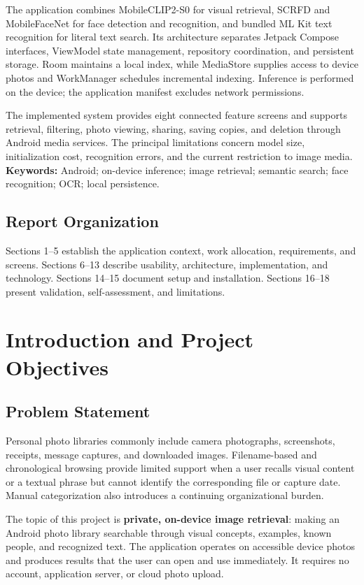\documentclass[11pt,a4paper]{article}
\newcommand{\reportsection}[1]{\section{#1}}
\begin{document}
The application combines MobileCLIP2-S0 for visual retrieval, SCRFD and MobileFaceNet for face detection and recognition, and bundled ML Kit text recognition for literal text search. Its architecture separates Jetpack Compose interfaces, ViewModel state management, repository coordination, and persistent storage. Room maintains a local index, while MediaStore supplies access to device photos and WorkManager schedules incremental indexing. Inference is performed on the device; the application manifest excludes network permissions.

The implemented system provides eight connected feature screens and supports retrieval, filtering, photo viewing, sharing, saving copies, and deletion through Android media services. The principal limitations concern model size, initialization cost, recognition errors, and the current restriction to image media. 
\textbf{Keywords:} Android; on-device inference; image retrieval; semantic search; face recognition; OCR; local persistence.


\subsection*{Report Organization}
Sections 1--5 establish the application context, work allocation, requirements, and screens. Sections 6--13 describe usability, architecture, implementation, and technology. Sections 14--15 document setup and installation. Sections 16--18 present validation, self-assessment, and limitations.

\clearpage
{}
{\small\tableofcontents}
\clearpage
{}

\reportsection{Introduction and Project Objectives}

\subsection{Problem Statement}

Personal photo libraries commonly include camera photographs, screenshots, receipts, message captures, and downloaded images. Filename-based and chronological browsing provide limited support when a user recalls visual content or a textual phrase but cannot identify the corresponding file or capture date. Manual categorization also introduces a continuing organizational burden.

The topic of this project is \textbf{private, on-device image retrieval}: making an Android photo library searchable through visual concepts, examples, known people, and recognized text. The application operates on accessible device photos and produces results that the user can open and use immediately. It requires no account, application server, or cloud photo upload.
\end{document}

